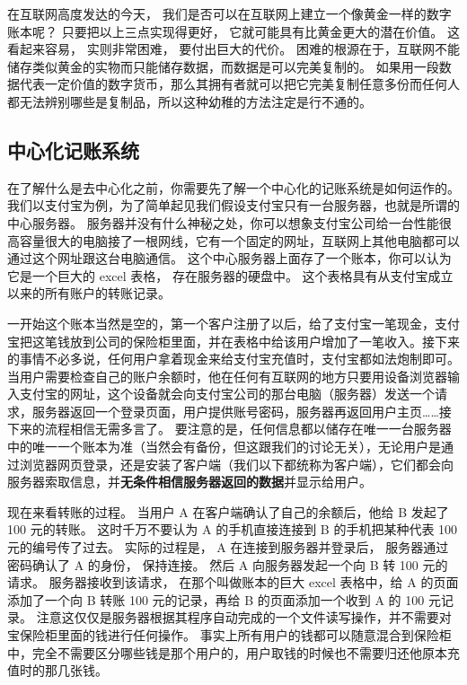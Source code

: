 在互联网高度发达的今天， 我们是否可以在互联网上建立一个像黄金一样的数字账本呢？ 只要把以上三点实现得更好， 它就可能具有比黄金更大的潜在价值。 这看起来容易， 实则非常困难， 要付出巨大的代价。 困难的根源在于，互联网不能储存类似黄金的实物而只能储存数据，而数据是可以完美复制的。 如果用一段数据代表一定价值的数字货币，那么其拥有者就可以把它完美复制任意多份而任何人都无法辨别哪些是复制品，所以这种幼稚的方法注定是行不通的。

\subsection{中心化记账系统}
在了解什么是去中心化之前，你需要先了解一个中心化的记账系统是如何运作的。我们以支付宝为例，为了简单起见我们假设支付宝只有一台服务器，也就是所谓的中心服务器。 服务器并没有什么神秘之处，你可以想象支付宝公司给一台性能很高容量很大的电脑接了一根网线，它有一个固定的网址，互联网上其他电脑都可以通过这个网址跟这台电脑通信。 这个中心服务器上面存了一个账本，你可以认为它是一个巨大的 excel 表格， 存在服务器的硬盘中。 这个表格具有从支付宝成立以来的所有账户的转账记录。

一开始这个账本当然是空的，第一个客户注册了以后，给了支付宝一笔现金，支付宝把这笔钱放到公司的保险柜里面，并在表格中给该用户增加了一笔收入。接下来的事情不必多说，任何用户拿着现金来给支付宝充值时，支付宝都如法炮制即可。 当用户需要检查自己的账户余额时，他在任何有互联网的地方只要用设备浏览器输入支付宝的网址，这个设备就会向支付宝公司的那台电脑（服务器）发送一个请求，服务器返回一个登录页面，用户提供账号密码，服务器再返回用户主页……接下来的流程相信无需多言了。 要注意的是，任何信息都以储存在唯一一台服务器中的唯一一个账本为准（当然会有备份，但这跟我们的讨论无关），无论用户是通过浏览器网页登录，还是安装了客户端（我们以下都统称为客户端），它们都会向服务器索取信息，并\textbf{无条件相信服务器返回的数据}并显示给用户。

现在来看转账的过程。 当用户 A 在客户端确认了自己的余额后，他给 B 发起了 100 元的转账。 这时千万不要认为 A 的手机直接连接到 B 的手机把某种代表 100 元的编号传了过去。 实际的过程是， A 在连接到服务器并登录后， 服务器通过密码确认了 A 的身份， 保持连接。 然后 A 向服务器发起一个向 B 转 100 元的请求。 服务器接收到该请求， 在那个叫做账本的巨大 excel 表格中，给 A 的页面添加了一个向 B 转账 100 元的记录，再给 B 的页面添加一个收到 A 的 100 元记录。 注意这仅仅是服务器根据其程序自动完成的一个文件读写操作，并不需要对宝保险柜里面的钱进行任何操作。 事实上所有用户的钱都可以随意混合到保险柜中，完全不需要区分哪些钱是那个用户的，用户取钱的时候也不需要归还他原本充值时的那几张钱。

